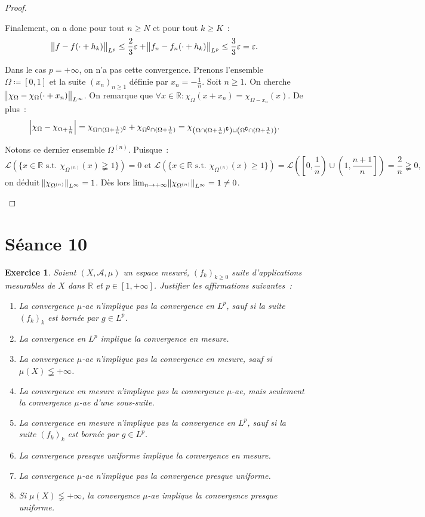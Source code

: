 \documentclass{article}
\newtheorem{ex}{Exercice}[section]
\newcommand{\pinfty}{{+\infty}}
\newcommand{\st}{\text{ s.t. }}
\newcommand{\C}{\complement}
\newcommand{\R}{{\mathbb R}}
\begin{document}
\begin{proof}
\begin{enumerate}
	Finalement, on a donc pour tout $n \geq N$ et pour tout $k \geq K$~:
	\[\norm {f-f(\cdot+h_k)}_{L^p} \leq \frac 23\varepsilon + \norm {f_n-f_n(\cdot+h_k)}_{L^p} \leq \frac 33\varepsilon = \varepsilon.\]

	Dans le cas $p = \pinfty$, on n'a pas cette convergence. Prenons l'ensemble $\Omega \coloneqq [0, 1]$ et la suite $(x_n)_{n \geq 1}$ définie par $x_n = -\frac 1n$.
	Soit $n \geq 1$. On cherche $\norm {\chi_\Omega-\chi_\Omega(\cdot + x_n)}_{L^\infty}$. On remarque que $\forall x \in \R : \chi_\Omega(x+x_n) = \chi_{\Omega-x_n}(x)$.
	De plus~:
	\[\abs {\chi_\Omega - \chi_{\Omega+\frac 1n}} = \chi_{\Omega \cap (\Omega + \frac 1n)^\C} + \chi_{\Omega^\C \cap (\Omega+\frac 1n)}
		= \chi_{\left(\Omega \cap (\Omega+\frac 1n)^\C\right) \sqcup \left(\Omega^\C \cap (\Omega+\frac 1n)\right)}.\]

	Notons ce dernier ensemble $\Omega^{(n)}$. Puisque~:
	\[\mathcal L(\{x \in \R \st \chi_{\Omega^{(n)}}(x) \gneqq 1\}) = 0 \text{ et } \mathcal L(\{x \in \R \st \chi_{\Omega^{(n)}}(x) \geq 1\})
		= \mathcal L\left(\left[0, \frac 1n\right) \cup \left(1, \frac {n+1}n\right]\right) = \frac 2n \gneqq 0,\]
	on déduit $\norm {\chi_{\Omega^{(n)}}}_{L^\infty} = 1$.
	Dès lors $\lim_{n \to \pinfty}\norm {\chi_{\Omega^{(n)}}}_{L^\infty} = 1 \neq 0$.
\end{enumerate}
\end{proof}

\newpage
\section{Séance 10}

\begin{ex} Soient $(X, \mathcal A, \mu)$ un espace mesuré, $(f_k)_{k \geq 0}$ suite d'applications mesurables de $X$ dans $\R$ et $p \in [1, \pinfty]$.
Justifier les affirmations suivantes~:
\begin{enumerate}
	\item La convergence $\mu$-ae n'implique pas la convergence en $L^p$, sauf si la suite $(f_k)_k$ est bornée par $g \in L^p$.
	\item La convergence en $L^p$ implique la convergence en mesure.
	\item La convergence $\mu$-ae n'implique pas la convergence en mesure, sauf si $\mu(X) \lneqq \pinfty$.
	\item La convergence en mesure n'implique pas la convergence $\mu$-ae, mais seulement la convergence $\mu$-ae d'une sous-suite.
	\item La convergence en mesure n'implique pas la convergence en $L^p$, sauf si la suite $(f_k)_k$ est bornée par $g \in L^p$.
	\item La convergence presque uniforme implique la convergence en mesure.
	\item La convergence $\mu$-ae n'implique pas la convergence presque uniforme.
	\item Si $\mu(X) \lneqq \pinfty$, la convergence $\mu$-ae implique la convergence presque uniforme.
\end{enumerate}
\end{ex}
\end{document}
